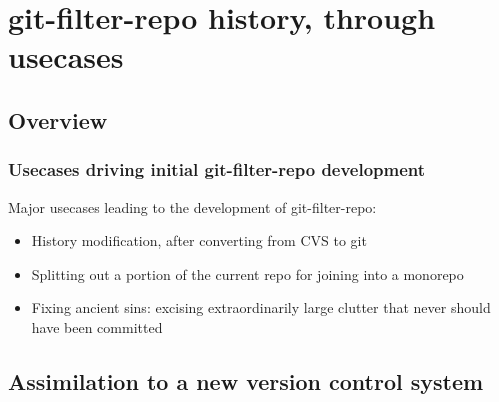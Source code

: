 \documentclass[compress,t,aspectratio=169]{beamer}
\begin{document}
\section[History]{git-filter-repo history, through usecases}
\subsection{Overview}

\begin{frame}
  \frametitle{Usecases driving initial git-filter-repo development}

  Major usecases leading to the development of git-filter-repo:
  \begin{itemize}
    \item History modification, after converting from CVS to git
    \item Splitting out a portion of the current repo for joining into a
          monorepo
    \item Fixing ancient sins: excising extraordinarily large clutter that
          never should have been committed
  \end{itemize}

\end{frame}

\subsection[Assimilation]{Assimilation to a new version control system}
\end{document}
